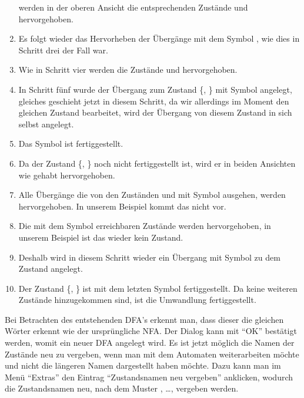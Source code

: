 \begin{enumerate}
  werden in der oberen Ansicht die entsprechenden Zustände  und
   hervorgehoben.
  \item Es folgt wieder das Hervorheben der Übergänge mit dem Symbol
  , wie dies in Schritt drei der Fall war.
  \item Wie in Schritt vier werden die Zustände  und 
  hervorgehoben.
  \item In Schritt fünf wurde der Übergang zum Zustand \{,
  \} mit Symbol  angelegt, gleiches geschieht jetzt in
  diesem Schritt, da wir allerdings im Moment den gleichen Zustand bearbeitet,
  wird der Übergang von diesem Zustand in sich selbst angelegt.
  \item Das Symbol  ist fertiggestellt.
  \item Da der Zustand \{, \} noch nicht fertiggestellt
  ist, wird er in beiden Ansichten wie gehabt hervorgehoben.
  \item Alle Übergänge die von den Zuständen  und  mit
  Symbol  ausgehen, werden hervorgehoben. In unserem Beispiel kommt
  das nicht vor.
  \item Die mit dem Symbol  erreichbaren Zustände werden
  hervorgehoben, in unserem Beispiel ist das wieder kein Zustand.
  \item Deshalb wird in diesem Schritt wieder ein Übergang mit Symbol
   zu dem Zustand \State{$\emptyset$} angelegt.
  \item Der Zustand \{, \} ist mit dem letzten Symbol
   fertiggestellt. Da keine weiteren Zustände hinzugekommen sind, ist
  die Umwandlung fertiggestellt.
\end{enumerate}

Bei Betrachten des entstehenden DFA's erkennt man, dass dieser die gleichen
Wörter erkennt wie der ursprüngliche NFA. Der Dialog kann mit "`OK"' bestätigt
werden, womit ein neuer DFA angelegt wird. Es ist jetzt möglich die Namen der
Zustände neu zu vergeben, wenn man mit dem Automaten weiterarbeiten möchte und
nicht die längeren Namen dargestellt haben möchte. Dazu kann man im Menü
"`Extras"' den Eintrag "`Zustandsnamen neu vergeben"' anklicken, wodurch die
Zustandsnamen neu, nach dem Muster ,  \ldots, vergeben
werden.\vspace{10pt}

